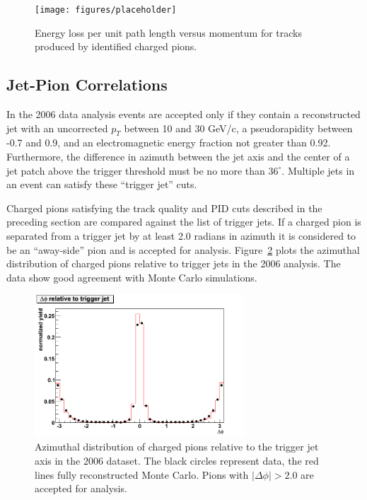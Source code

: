 \begin{figure}
  \centering
  \texttt{[image: figures/placeholder]}
  \caption{Energy loss per unit path length versus momentum for tracks produced by identified charged pions.}
  \label{fig:pid-accept-window}
\end{figure}

\subsection{Jet-Pion Correlations}


In the 2006 data analysis events are accepted only if they contain a
reconstructed jet with an uncorrected \(p_T\) between 10 and 30 GeV/c, a
pseudorapidity between -0.7 and 0.9, and an electromagnetic energy fraction not
greater than 0.92. Furthermore, the difference in azimuth between the jet axis
and the center of a jet patch above the trigger threshold must be no more than
\(36^\circ\). Multiple jets in an event can satisfy these ``trigger jet'' cuts.

Charged pions satisfying the track quality and PID cuts described in the
preceding section are compared against the list of trigger jets. If a charged
pion is separated from a trigger jet by at least 2.0 radians in azimuth it is
considered to be an ``away-side'' pion and is accepted for analysis.
Figure~\ref{fig:dphi} plots the azimuthal distribution of charged pions relative
to trigger jets in the 2006 analysis. The data show good agreement with Monte
Carlo simulations.

\begin{figure}
  \centering
  \includegraphics[width=0.7\textwidth]{figures/dphi}
  \caption{Azimuthal distribution of charged pions relative to the trigger jet axis in the 2006 dataset.  The black circles represent data, the red lines fully reconstructed Monte Carlo. Pions with $|\Delta \phi| > 2.0$ are accepted for analysis.}
  \label{fig:dphi}
\end{figure}

